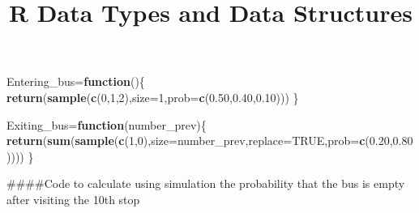 \documentclass[
]{article}
\title{R Data Types and Data Structures}
\author{}
\date{\vspace{-2.5em}}
\newenvironment{Shaded}{\begin{snugshade}}{\end{snugshade}}
\newcommand{\AttributeTok}[1]{\textcolor[rgb]{0.13,0.29,0.53}{#1}}
\newcommand{\ConstantTok}[1]{\textcolor[rgb]{0.56,0.35,0.01}{#1}}
\newcommand{\ControlFlowTok}[1]{\textcolor[rgb]{0.13,0.29,0.53}{\textbf{#1}}}
\newcommand{\DecValTok}[1]{\textcolor[rgb]{0.00,0.00,0.81}{#1}}
\newcommand{\FloatTok}[1]{\textcolor[rgb]{0.00,0.00,0.81}{#1}}
\newcommand{\FunctionTok}[1]{\textcolor[rgb]{0.13,0.29,0.53}{\textbf{#1}}}
\newcommand{\NormalTok}[1]{#1}
\newcommand{\OtherTok}[1]{\textcolor[rgb]{0.56,0.35,0.01}{#1}}
\begin{document}
\maketitle

\begin{Shaded}
\begin{Highlighting}[]
\NormalTok{Entering\_bus}\OtherTok{=}\ControlFlowTok{function}\NormalTok{()\{}
  \FunctionTok{return}\NormalTok{(}\FunctionTok{sample}\NormalTok{(}\FunctionTok{c}\NormalTok{(}\DecValTok{0}\NormalTok{,}\DecValTok{1}\NormalTok{,}\DecValTok{2}\NormalTok{),}\AttributeTok{size=}\DecValTok{1}\NormalTok{,}\AttributeTok{prob=}\FunctionTok{c}\NormalTok{(}\FloatTok{0.50}\NormalTok{,}\FloatTok{0.40}\NormalTok{,}\FloatTok{0.10}\NormalTok{)))}
\NormalTok{\}}
\end{Highlighting}
\end{Shaded}

\begin{Shaded}
\begin{Highlighting}[]
\NormalTok{Exiting\_bus}\OtherTok{=}\ControlFlowTok{function}\NormalTok{(number\_prev)\{}
  \FunctionTok{return}\NormalTok{(}\FunctionTok{sum}\NormalTok{(}\FunctionTok{sample}\NormalTok{(}\FunctionTok{c}\NormalTok{(}\DecValTok{1}\NormalTok{,}\DecValTok{0}\NormalTok{),}\AttributeTok{size=}\NormalTok{number\_prev,}\AttributeTok{replace=}\ConstantTok{TRUE}\NormalTok{,}\AttributeTok{prob=}\FunctionTok{c}\NormalTok{(}\FloatTok{0.20}\NormalTok{,}\FloatTok{0.80}\NormalTok{))))}
\NormalTok{\}}
\end{Highlighting}
\end{Shaded}

\#\#\#\#Code to calculate using simulation the probability that the bus
is empty after visiting the 10th stop
\end{document}
